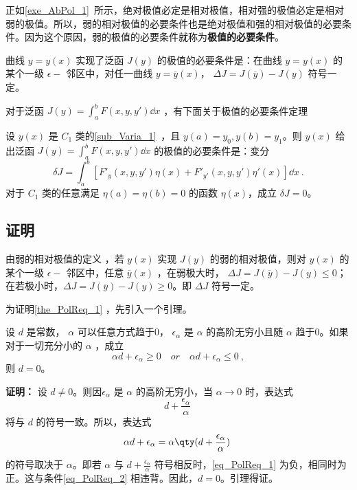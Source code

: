 

正如\autoref{exe_AbPol_1}~所示，绝对极值必定是相对极值，相对强的极值必定是相对弱的极值。所以，弱的相对极值的必要条件也是绝对极值和强的相对极值的必要条件。因为这个原因，弱的极值的必要条件就称为\textbf{极值的必要条件}。

曲线 $y=y(x)$ 实现了泛函 $J(y)$ 的极值的必要条件是：在曲线 $y=y(x)$ 的某个一级 $\epsilon-$ 邻区中，对任一曲线 $y=\overline{y}(x)$， $\Delta J=J(\overline{y})-J(y)$ 符号一定。

对于泛函 $J(y)=\int_a^bF(x,y,y')\dd x$ ，有下面关于极值的必要条件定理
\begin{theorem}{}\label{the_PolReq_1}
设 $y(x)$ 是 $C_1$ 类的\autoref{sub_Varia_1}~，且 $y(a)=y_0,y(b)=y_1$。则 $y(x)$ 给出泛函 $J(y)=\int_a^bF(x,y,y')\dd x$ 的极值的必要条件是：变分
\begin{equation}
\delta J=\int_a^b[F'_y(x,y,y')\eta(x)+F'_{y'}(x,y,y')\eta'(x)]\dd x~.
\end{equation}
对于 $C_1$ 类的任意满足 $\eta(a)=\eta(b)=0$ 的函数 $\eta(x)$，成立 $\delta J=0$。
\end{theorem}
\subsection{证明}
由弱的相对极值的定义 ，若 $y(x)$ 实现 $J(y)$ 的弱的相对极值，则对 $y(x)$ 的某个一级 $\epsilon-$ 邻区中，任意 $\overline{y}(x)$ ，在弱极大时， $\Delta J=J(\overline{y})-J(y)\leq 0$；在若极小时，$\Delta J=J(\overline{y})-J(y)\geq 0$。即 $\Delta J$ 符号一定。

为证明\autoref{the_PolReq_1} ，先引入一个引理。
\begin{lemma}{}\label{lem_PolReq_1}
设 $d$ 是常数， $\alpha$ 可以任意方式趋于0， $\epsilon_\alpha$ 是 $\alpha$ 的高阶无穷小且随 $\alpha$ 趋于0。如果对于一切充分小的 $\alpha$ ，成立 
\begin{equation}\label{eq_PolReq_2}
\alpha d+\epsilon_\alpha\geq0\quad or\quad\alpha d+\epsilon_\alpha\leq0~,
\end{equation}
则 $d=0$。
\end{lemma}
\textbf{证明：} 设 $d\neq 0$。则因$\epsilon_\alpha$ 是 $\alpha$ 的高阶无穷小，当 $\alpha\rightarrow0$ 时，表达式
\begin{equation}
d+\frac{\epsilon_\alpha}{\alpha}~
\end{equation}
 将与 $d$ 的符号一致。所以，表达式
 \begin{equation}\label{eq_PolReq_1}
 \alpha d+\epsilon_\alpha=\alpha\qty(d+\frac{\epsilon_\alpha}{\alpha})~
 \end{equation}
 的符号取决于 $\alpha$。即若 $\alpha$ 与 $d+\frac{\epsilon_\alpha}{\alpha}$ 符号相反时，\autoref{eq_PolReq_1} 为负，相同时为正。这与条件\autoref{eq_PolReq_2} 相违背。因此，$d=0$。引理得证。
